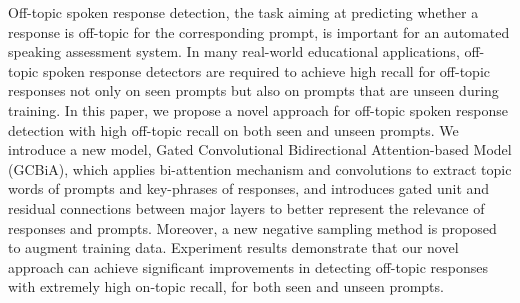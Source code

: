 Off-topic spoken response detection, the task aiming at predicting whether a response is off-topic for the corresponding prompt, is important for an automated speaking assessment system. In many real-world educational applications, off-topic spoken response detectors are required to achieve high recall for off-topic responses not only on seen prompts but also on prompts that are unseen during training. In this paper, we propose a novel approach for off-topic spoken response detection with high off-topic recall on both seen and unseen prompts. We introduce a new model, Gated Convolutional Bidirectional Attention-based Model (GCBiA), which applies bi-attention mechanism and convolutions to extract topic words of prompts and key-phrases of responses, and introduces gated unit and residual connections between major layers to better represent the relevance of responses and prompts. Moreover, a new negative sampling method is proposed to augment training data. Experiment results demonstrate that our novel approach can achieve significant improvements in detecting off-topic responses with extremely high on-topic recall, for both seen and unseen prompts.
